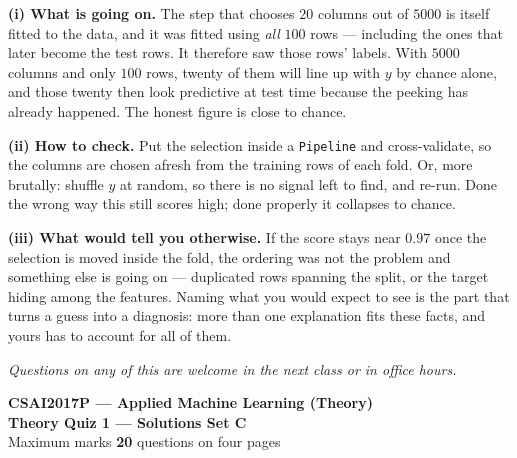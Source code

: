 \documentclass[10pt,a4paper]{article}
\newcommand{\SetLetter}{}
\begin{document}
\vspace{4pt}

\textbf{(i) What is going on.} The step that chooses $20$ columns out of $5000$ is itself fitted to the data, and it was fitted using \emph{all} $100$ rows --- including the ones that later become the test rows. It therefore saw those rows' labels. With $5000$ columns and only $100$ rows, twenty of them will line up with $y$ by chance alone, and those twenty then look predictive at test time because the peeking has already happened. The honest figure is close to chance.\par\vspace{1mm}\textbf{(ii) How to check.} Put the selection inside a \texttt{Pipeline} and cross-validate, so the columns are chosen afresh from the training rows of each fold. Or, more brutally: shuffle $y$ at random, so there is no signal left to find, and re-run. Done the wrong way this still scores high; done properly it collapses to chance.\par\vspace{1mm}\textbf{(iii) What would tell you otherwise.} If the score stays near $0.97$ once the selection is moved inside the fold, the ordering was not the problem and something else is going on --- duplicated rows spanning the split, or the target hiding among the features. Naming what you would expect to see is the part that turns a guess into a diagnosis: more than one explanation fits these facts, and yours has to account for all of them.

\vfill

{\footnotesize\itshape Questions on any of this are welcome in the next class or in office hours.}

\newpage


\renewcommand{\SetLetter}{C}\setcounter{page}{1}

\begin{center}
{\large\bfseries CSAI2017P --- Applied Machine Learning (Theory)}\\[2pt]
{\large\bfseries Theory Quiz 1 --- Solutions \quad\textbullet\quad Set C}\\[3pt]
{\small Maximum marks \textbf{20} \quad\textbullet{} questions on four pages}
\end{center}
\vspace{2pt}

\noindent{}
\vspace{3pt}
\end{document}

